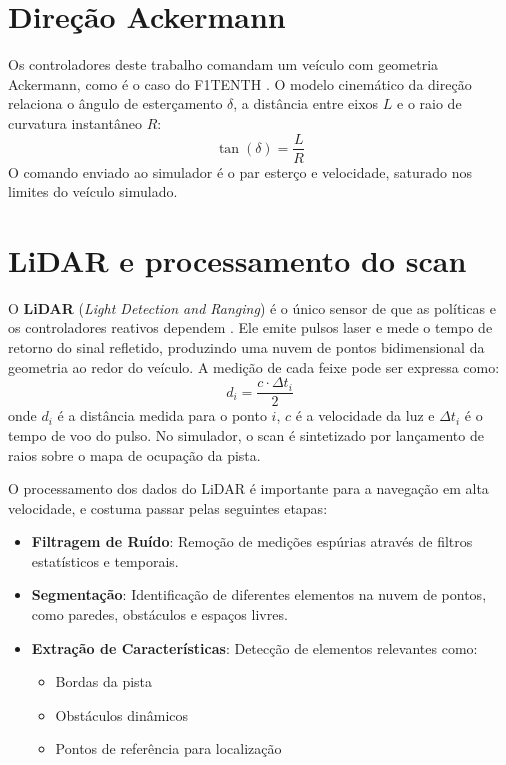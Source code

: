 \section{Direção Ackermann}

Os controladores deste trabalho comandam um veículo com geometria Ackermann, como
é o caso do F1TENTH \cite{Babu2020Simulator}. O modelo cinemático da direção
relaciona o ângulo de esterçamento $\delta$, a distância entre eixos $L$ e o raio
de curvatura instantâneo $R$:
\begin{equation}
    \tan(\delta) = \frac{L}{R}
    \label{eq:ackermann_steering}
\end{equation}
O comando enviado ao simulador é o par esterço e velocidade, saturado nos limites
do veículo simulado.

\section{LiDAR e processamento do scan}

O \textbf{LiDAR} (\textit{Light Detection and Ranging}) é o único sensor de que as
políticas e os controladores reativos dependem
\cite{OKelly2020F1TENTH}. Ele emite pulsos laser e mede o tempo de retorno do
sinal refletido, produzindo uma nuvem de pontos bidimensional da geometria ao
redor do veículo. A medição de cada feixe pode ser expressa como:
\begin{equation}
    d_i = \frac{c \cdot \Delta t_i}{2}
    \label{eq:lidar_measurement}
\end{equation}
onde $d_i$ é a distância medida para o ponto $i$, $c$ é a velocidade da luz e
$\Delta t_i$ é o tempo de voo do pulso. No simulador, o scan é sintetizado por
lançamento de raios sobre o mapa de ocupação da pista.

O processamento dos dados do LiDAR é importante para a navegação em alta
velocidade, e costuma passar pelas seguintes etapas:

\begin{itemize}
    \item \textbf{Filtragem de Ruído}: Remoção de medições espúrias através de filtros estatísticos e temporais.
    \item \textbf{Segmentação}: Identificação de diferentes elementos na nuvem de pontos, como paredes, obstáculos e espaços livres.
    \item \textbf{Extração de Características}: Detecção de elementos relevantes como:
          \begin{itemize}
              \item Bordas da pista
              \item Obstáculos dinâmicos
              \item Pontos de referência para localização
          \end{itemize}
\end{itemize}

